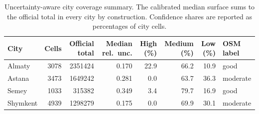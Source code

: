\begin{table}[H]
\centering
\small
\caption{Uncertainty-aware city coverage summary. The calibrated median surface sums to the official total in every city by construction. Confidence shares are reported as percentages of city cells.}
\label{tab:uncertainty-city-coverage-unified}
\begin{tabular}{lrrrrrrl}
\toprule
City & Cells & Official total & Median rel.\ unc. & High (\%) & Medium (\%) & Low (\%) & OSM label \\
\midrule
Almaty   & 3078 & 2351424 & 0.170 & 22.9 & 66.2 & 10.9 & good \\
Astana   & 3473 & 1649242 & 0.281 & 0.0  & 63.7 & 36.3 & moderate \\
Semey    & 1033 & 315382  & 0.349 & 3.4  & 79.7 & 16.9 & good \\
Shymkent & 4939 & 1298279 & 0.175 & 0.0  & 69.9 & 30.1 & moderate \\
\bottomrule
\end{tabular}
\end{table}

